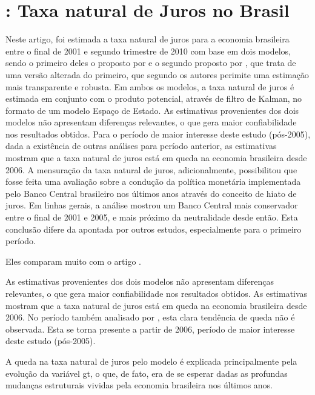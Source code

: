 \section{\citet{Ribeiro:2013}: Taxa natural de Juros no Brasil}
Neste artigo, foi estimada a taxa natural de juros para a economia brasileira entre o final de 2001 e segundo trimestre de 2010 com base em dois modelos, sendo o primeiro deles o proposto por \citet{LW:2003} e o segundo proposto por \citet{Renne:2007}, que
trata de uma versão alterada do primeiro, que segundo os autores perimite uma estimação mais transparente e robusta. Em ambos os modelos, a taxa natural de juros é estimada em conjunto com o produto potencial, através de filtro de Kalman, no formato de um modelo Espaço de Estado. As estimativas provenientes dos dois modelos não apresentam diferenças relevantes, o que gera maior confiabilidade nos resultados obtidos. Para o período de maior interesse deste estudo (pós-2005), dada a existência de outras análises para período anterior, as estimativas mostram que a taxa natural de juros está em queda na economia brasileira desde 2006. A mensuração da taxa natural de juros, adicionalmente, possibilitou que fosse feita uma avaliação sobre a condução da política monetária implementada pelo Banco Central brasileiro nos últimos anos através do conceito de hiato de juros. Em linhas gerais, a análise mostrou um Banco Central mais conservador entre o final de 2001 e 2005, e mais próximo da neutralidade desde então. Esta conclusão difere da apontada por outros estudos, especialmente para o primeiro período.

Eles comparam muito com o artigo \citet{Portugal:2009}.

As estimativas provenientes dos dois modelos não apresentam diferenças relevantes, o que gera maior confiabilidade nos resultados obtidos. As estimativas mostram que a taxa natural
de juros está em queda na economia brasileira desde 2006. No período também analisado por \citet{Portugal:2009}, esta clara tendência de queda não é observada. Esta se torna
presente a partir de 2006, período de maior interesse deste estudo (pós-2005).

A queda na taxa natural de juros pelo modelo é explicada principalmente pela evolução da variável gt, o que, de fato, era de se esperar dadas as profundas mudanças estruturais vividas
pela economia brasileira nos últimos anos.

